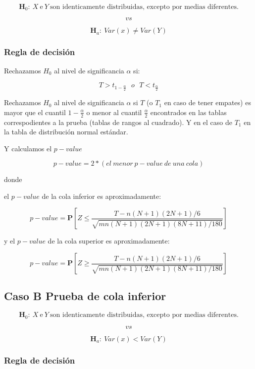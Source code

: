 \documentclass[
  a4paper,
  oneside,
  openany]{book}
\begin{document}
\[\textbf{H}_0: \ X \ \mbox{e} \  Y \ \mbox{son identicamente distribuidas, excepto por medias diferentes.}\]

\[vs\]

\[\textbf{H}_a: \ Var(x) \neq  Var(Y)\]

\hypertarget{regla-de-decisiuxf3n-17}{%
\subsubsection*{Regla de decisión}\label{regla-de-decisiuxf3n-17}}


Rechazamos \(H_0\) al nivel de significancia \(\alpha\) si:

\[T>t_{1-\frac{\alpha}{2}} \ \ \   o \ \ \  T<t_{\frac{\alpha}{2}}\]

Rechazamos \(H_0\) al nivel de significancia \(\alpha\) si \(T\) (o \(T_1\) en caso de tener empates) es mayor que el cuantil \(1-\frac{\alpha}{2}\) o menor al cuantil \(\frac{\alpha}{2}\) encontrados en las tablas correspodientes a la prueba (tablas de rangos al cuadrado). Y en el caso de \(T_{1}\) en la tabla de distribución normal estándar.

Y calculamos el \(p-value\)

\[p-value= 2*(el \ menor\ p-value\ de\ una\ cola)\]

donde

el \(p-value\) de la cola inferior es aproximadamente:

\[ p-value=\mathbf{P}\left[Z\leq\frac{T-n(N+1)(2N+1)/6}{\sqrt{mn(N+1)(2N+1)(8N+11)/180}}\right]\]

y el \(p-value\) de la cola superior es aproximadamente:

\[p-value=\mathbf{P}\left[Z\geq\frac{T-n(N+1)(2N+1)/6}{\sqrt{mn(N+1)(2N+1)(8N+11)/180}}\right]\]

\hypertarget{caso-b-prueba-de-cola-inferior-5}{%
\subsection*{Caso B Prueba de cola inferior}\label{caso-b-prueba-de-cola-inferior-5}}


\[\textbf{H}_0: \ X \  \mbox{e} \  Y \ \mbox{son identicamente distribuidas, excepto por medias diferentes.}\]

\[vs\]

\[\textbf{H}_a: \ Var(x) < Var(Y)\]

\hypertarget{regla-de-decisiuxf3n-18}{%
\subsubsection*{Regla de decisión}\label{regla-de-decisiuxf3n-18}}
\end{document}
